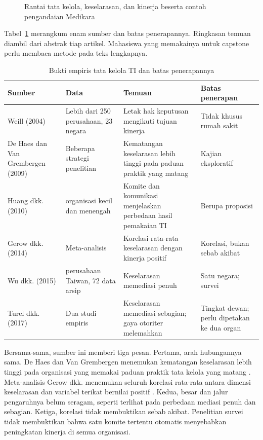 \begin{figure}[!htb]
  \centering
  
  \caption{Rantai tata kelola, keselarasan, dan kinerja beserta contoh pengandaian Medikara}
  \label{fig:ch02-rantai-nilai}
\end{figure}

Tabel~\ref{tab:ch02-bukti} merangkum enam sumber dan batas penerapannya. Ringkasan temuan diambil
dari abstrak tiap artikel. Mahasiswa yang memakainya untuk capstone perlu membaca metode pada
teks lengkapnya.

\begin{table}[!htb]
  \centering\small
  \caption{Bukti empiris tata kelola TI dan batas penerapannya}\label{tab:ch02-bukti}
  \begin{tabularx}{\textwidth}{|>{\raggedright\arraybackslash}p{}|>{\raggedright\arraybackslash}p{}|>{\raggedright\arraybackslash}X|>{\raggedright\arraybackslash}p{}|}
    \hline
    \textbf{Sumber} & \textbf{Data} & \textbf{Temuan} & \textbf{Batas penerapan} \\ \hline
    Weill (2004) & Lebih dari 250 perusahaan, 23 negara & Letak hak keputusan mengikuti tujuan
    kinerja & Tidak khusus rumah sakit \\ \hline
    De Haes dan Van Grembergen (2009) & Beberapa strategi penelitian & Kematangan keselarasan
    lebih tinggi pada paduan praktik yang matang & Kajian eksploratif \\ \hline
    Huang dkk. (2010) & 3 organisasi kecil dan menengah & Komite dan komunikasi menjelaskan
    perbedaan hasil pemakaian TI & Berupa proposisi \\ \hline
    Gerow dkk. (2014) & Meta-analisis & Korelasi rata-rata keselarasan dengan kinerja positif &
    Korelasi, bukan sebab akibat \\ \hline
    Wu dkk. (2015) & 131 perusahaan Taiwan, 72 data arsip & Keselarasan memediasi penuh &
    Satu negara; survei \\ \hline
    Turel dkk. (2017) & Dua studi empiris & Keselarasan memediasi sebagian; gaya otoriter
    melemahkan & Tingkat dewan; perlu dipetakan ke dua organ \\ \hline
  \end{tabularx}
\end{table}

Bersama-sama, sumber ini memberi tiga pesan. Pertama, arah hubungannya sama. De Haes
dan Van Grembergen menemukan kematangan keselarasan lebih tinggi pada organisasi yang memakai
paduan praktik tata kelola yang matang \cite{c02-dehaes2009}. Meta-analisis Gerow dkk. menemukan
seluruh korelasi rata-rata antara dimensi keselarasan dan variabel terikat bernilai positif
\cite{c02-gerow2014}. Kedua, besar dan jalur pengaruhnya belum seragam, seperti terlihat pada
perbedaan mediasi penuh dan sebagian. Ketiga, korelasi tidak membuktikan sebab akibat. Penelitian
survei tidak membuktikan bahwa satu komite tertentu otomatis menyebabkan peningkatan kinerja di
semua organisasi.

